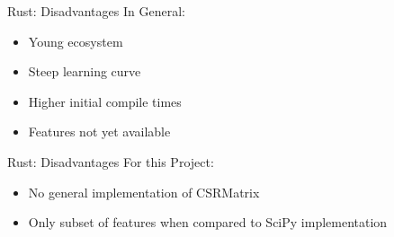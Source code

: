 \begin{frame}[c]{Rust: Disadvantages}
    \Large
    In General:
    \begin{itemize}[<+(1)->]
        \item Young ecosystem
        \item Steep learning curve
        \item Higher initial compile times
        \item Features not yet available
    \end{itemize}
\end{frame}


\begin{frame}[c]{Rust: Disadvantages}
    \Large
    For this Project:
    \begin{itemize}[<+(1)->]
        \item No general implementation of CSRMatrix
        \item Only subset of features when compared to SciPy implementation
    \end{itemize}
\end{frame}


